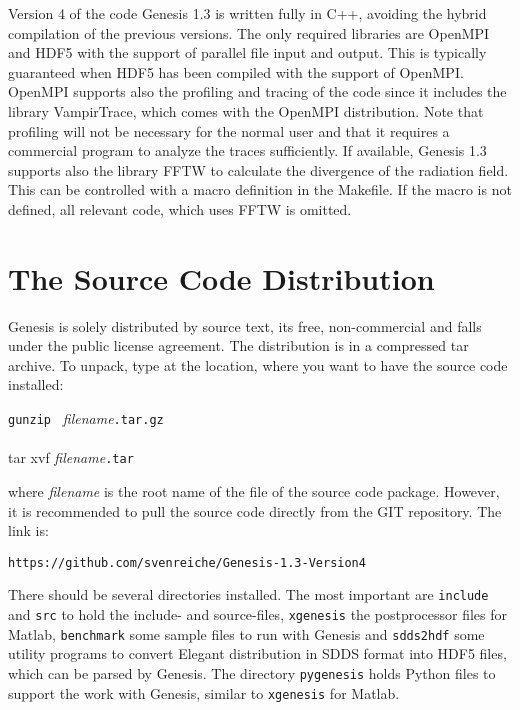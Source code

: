 \documentclass[12pt]{book}
\begin{document}
Version 4 of the code Genesis 1.3 is written fully in C++, avoiding the hybrid compilation of the previous versions. The only required libraries are OpenMPI and HDF5 with the support of parallel file input and output. This is typically guaranteed when HDF5 has been compiled with the support of OpenMPI.  OpenMPI supports also the profiling and tracing of the code since it includes the library VampirTrace, which comes with the OpenMPI distribution.  Note that profiling will not be necessary for the normal user and that it requires a commercial program to analyze the traces sufficiently.
If available, Genesis 1.3 supports also the library FFTW to calculate the divergence of the radiation field. This can be controlled with a macro definition in the Makefile. If the macro is not defined, all relevant code, which uses FFTW is omitted.

\section{\sf The Source Code Distribution}

Genesis is solely distributed by source text, its free, non-commercial and falls under the public license agreement. The distribution is in a compressed tar archive. To unpack, type at the location, where you want to have the source code installed:

{\tt gunzip } {\it filename}{\tt .tar.gz}\\
{\\ tar xvf} {\it filename}{\tt .tar}

where {\it filename} is the root name of the file of the source code package.
However, it is recommended to pull the source code directly from the GIT repository. The link is:

{\tt https://github.com/svenreiche/Genesis-1.3-Version4 }



There should be several directories installed. The most important are {\tt include} and {\tt src} to hold the include- and source-files, {\tt xgenesis} the postprocessor files for Matlab, {\tt benchmark} some sample files to run with Genesis and {\tt sdds2hdf} some utility programs to convert Elegant distribution in SDDS format into HDF5 files, which can be parsed by Genesis. The directory {\tt pygenesis} holds Python files to support the work with Genesis, similar to {\tt xgenesis} for Matlab.
\end{document}
